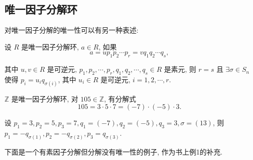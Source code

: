 \documentclass[UTF8]{ctexart}
\begin{document}
\subsection{唯一因子分解环}
对唯一因子分解的唯一性可以有另一种表述:
\begin{definition}
    设 $R$ 是唯一因子分解环, $a\in R$, 如果
    \[a=up_1p_2\cdots p_r=vq_1q_2\cdots q_s,\]

    其中 $u,v\in R$ 是可逆元, $p_1,p_2,\cdots,p_r,q_1,q_2,\cdots,q_s\in R$ 是素元, 则 $r=s$ 且 $\exists\sigma\in S_n$ 使得 $p_i=u_iq_{\sigma(i)}$, 其中 $u_i\in R$ 是可逆元, $i=1,2,\cdots,r$.
\end{definition}
\begin{example}
    $\mathbb{Z}$ 是唯一因子分解环, 对 $105\in\mathbb{Z}$, 有分解式
    \[105=3\cdot 5\cdot 7=(-7)\cdot(-5)\cdot 3.\]

    设 $p_1=3,p_2=5,p_3=7,q_1=(-7),q_2=(-5),q_3=3,\sigma=(13)$, 则 $p_1=-q_{\sigma(1)},p_2=-q_{\sigma(2)},p_3=q_{\sigma(3)}$.
\end{example}
下面是一个有素因子分解但分解没有唯一性的例子, 作为书上例1的补充.
\end{document}
